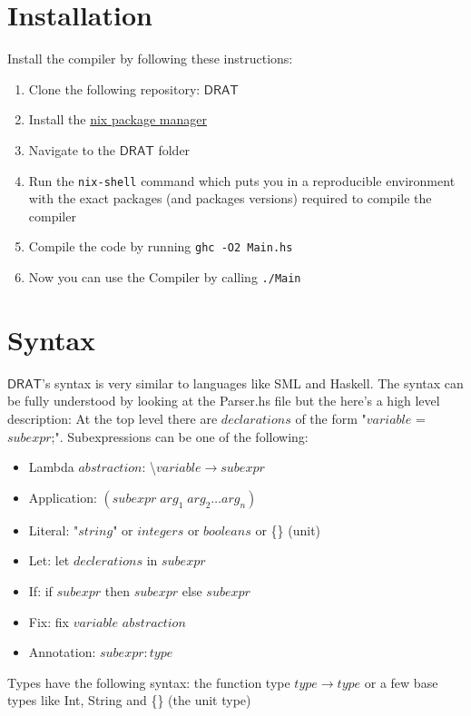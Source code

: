 \documentclass{article} %
\newcommand{\DRAT}{\mathsf{DRAT}}
\begin{document}
\section{Installation}
Install the compiler by following these instructions:
\begin{enumerate}
    \item Clone the following repository: \href{https://bitbucket.org/bu_bmabsout/cs525-2019-fall-bmabsout/src/master/project/Drat/}{$\DRAT$}
    \item Install the \href{https://nixos.org/nix/}{nix package manager}
    \item Navigate to the $\DRAT$ folder
    \item Run the \texttt{nix-shell} command which puts you in a reproducible environment with the exact packages (and packages versions) required to compile the compiler
    \item Compile the code by running \texttt{ghc -O2 Main.hs}
    \item Now you can use the Compiler by calling \texttt{./Main}
\end{enumerate}
\newpage
\section{Syntax}
$\DRAT$'s syntax is very similar to languages like SML and Haskell. The syntax can be fully understood by looking at the Parser.hs file but the here's a high level description: At the top level there are $declarations$ of the form "$variable$ = $subexpr$;". Subexpressions can be one of the following:
\begin{itemize}
    \item Lambda $abstraction$: \textbackslash $variable \to subexpr$
    \item Application: $(subexpr\;arg_1\;arg_2 \dots arg_n)$
    \item Literal: "$string$" or $integers$ or $booleans$ or \{\} (unit)
    \item Let: let $declerations$ in $subexpr$
    \item If: if $subexpr$ then $subexpr$ else $subexpr$
    \item Fix: fix $variable$ $abstraction$
    \item Annotation: $subexpr: type$
\end{itemize}
    Types have the following syntax: the function type $type \to type$ or a few base types like Int, String and \{\} (the unit type)
\end{document}
